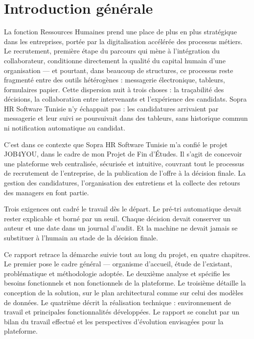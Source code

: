 \documentclass[]{./tpl/isipfe}
\begin{document}
\chapter*{Introduction générale}
\adjustmtc

La fonction Ressources Humaines prend une place de plus en plus stratégique dans les entreprises, portée par la digitalisation accélérée des processus métiers. Le recrutement, première étape du parcours qui mène à l’intégration du collaborateur, conditionne directement la qualité du capital humain d’une organisation — et pourtant, dans beaucoup de structures, ce processus reste fragmenté entre des outils hétérogènes : messagerie électronique, tableurs, formulaires papier. Cette dispersion nuit à trois choses : la traçabilité des décisions, la collaboration entre intervenants et l’expérience des candidats. Sopra HR Software Tunisie n’y échappait pas : les candidatures arrivaient par messagerie et leur suivi se poursuivait dans des tableurs, sans historique commun ni notification automatique au candidat.

C’est dans ce contexte que Sopra HR Software Tunisie m’a confié le projet JOB4YOU, dans le cadre de mon Projet de Fin d’Études. Il s’agit de concevoir une plateforme web centralisée, sécurisée et intuitive, couvrant tout le processus de recrutement de l’entreprise, de la publication de l’offre à la décision finale. La gestion des candidatures, l’organisation des entretiens et la collecte des retours des managers en font partie.

Trois exigences ont cadré le travail dès le départ. Le pré-tri automatique devait rester explicable et borné par un seuil. Chaque décision devait conserver un auteur et une date dans un journal d’audit. Et la machine ne devait jamais se substituer à l’humain au stade de la décision finale.

Ce rapport retrace la démarche suivie tout au long du projet, en quatre chapitres. Le premier pose le cadre général — organisme d’accueil, étude de l’existant, problématique et méthodologie adoptée. Le deuxième analyse et spécifie les besoins fonctionnels et non fonctionnels de la plateforme. Le troisième détaille la conception de la solution, sur le plan architectural comme sur celui des modèles de données. Le quatrième décrit la réalisation technique : environnement de travail et principales fonctionnalités développées. Le rapport se conclut par un bilan du travail effectué et les perspectives d’évolution envisagées pour la plateforme.
\end{document}
